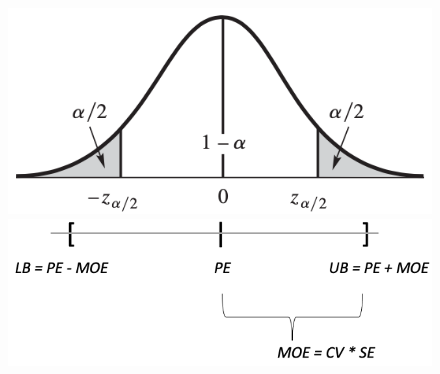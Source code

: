 \documentclass{article}
\begin{document}
\begin{itemize}
    \begin{figure}[H]
    \begin{minipage}{0.45\textwidth}
        \center\includegraphics[scale=0.5]{images/z-critical-values.png}
    \end{minipage}
    \begin{minipage}{0.4\textwidth}
        \center\includegraphics[scale=0.5]{images/ci-general.png}
    \end{minipage}
    \end{figure}


\end{itemize}
\end{document}
